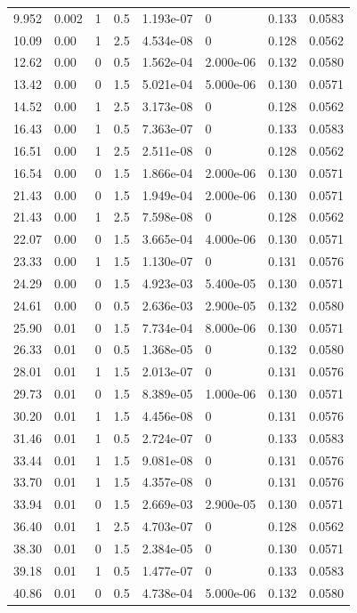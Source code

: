 \documentclass[preview]{standalone}
\begin{document}
{{\begin{tabular}{L{1.2cm}C{1.2cm} C{0.3cm}C{0.5cm} C{1.4cm}C{1.4cm} C{1.4cm}C{1.4cm}}
  9.952  &  0.002  & 1     & 0.5 &  1.193e-07  & 0  & 0.133 &  0.0583   \\ 
  10.09  &  0.00  & 1     & 2.5 &  4.534e-08  & 0  & 0.128 &  0.0562   \\ 
  12.62  &  0.00  & 0     & 0.5 &  1.562e-04  & 2.000e-06  & 0.132 &  0.0580   \\ 
  13.42  &  0.00  & 0     & 1.5 &  5.021e-04  & 5.000e-06  & 0.130 &  0.0571   \\ 
  14.52  &  0.00  & 1     & 2.5 &  3.173e-08  & 0  & 0.128 &  0.0562   \\ 
  16.43  &  0.00  & 1     & 0.5 &  7.363e-07  & 0  & 0.133 &  0.0583   \\ 
  16.51  &  0.00  & 1     & 2.5 &  2.511e-08  & 0  & 0.128 &  0.0562   \\ 
  16.54  &  0.00  & 0     & 1.5 &  1.866e-04  & 2.000e-06  & 0.130 &  0.0571   \\ 
  21.43  &  0.00  & 0     & 1.5 &  1.949e-04  & 2.000e-06  & 0.130 &  0.0571   \\ 
  21.43  &  0.00  & 1     & 2.5 &  7.598e-08  & 0  & 0.128 &  0.0562   \\ 
  22.07  &  0.00  & 0     & 1.5 &  3.665e-04  & 4.000e-06  & 0.130 &  0.0571   \\ 
  23.33  &  0.00  & 1     & 1.5 &  1.130e-07  & 0  & 0.131 &  0.0576   \\ 
  24.29  &  0.00  & 0     & 1.5 &  4.923e-03  & 5.400e-05  & 0.130 &  0.0571   \\ 
  24.61  &  0.00  & 0     & 0.5 &  2.636e-03  & 2.900e-05  & 0.132 &  0.0580   \\ 
  25.90  &  0.01  & 0     & 1.5 &  7.734e-04  & 8.000e-06  & 0.130 &  0.0571   \\ 
  26.33  &  0.01  & 0     & 0.5 &  1.368e-05  & 0  & 0.132 &  0.0580   \\ 
  28.01  &  0.01  & 1     & 1.5 &  2.013e-07  & 0  & 0.131 &  0.0576   \\ 
  29.73  &  0.01  & 0     & 1.5 &  8.389e-05  & 1.000e-06  & 0.130 &  0.0571   \\ 
  30.20  &  0.01  & 1     & 1.5 &  4.456e-08  & 0  & 0.131 &  0.0576   \\ 
  31.46  &  0.01  & 1     & 0.5 &  2.724e-07  & 0  & 0.133 &  0.0583   \\ 
  33.44  &  0.01  & 1     & 1.5 &  9.081e-08  & 0  & 0.131 &  0.0576   \\ 
  33.70  &  0.01  & 1     & 1.5 &  4.357e-08  & 0  & 0.131 &  0.0576   \\ 
  33.94  &  0.01  & 0     & 1.5 &  2.669e-03  & 2.900e-05  & 0.130 &  0.0571   \\ 
  36.40  &  0.01  & 1     & 2.5 &  4.703e-07  & 0  & 0.128 &  0.0562   \\ 
  38.30  &  0.01  & 0     & 1.5 &  2.384e-05  & 0  & 0.130 &  0.0571   \\ 
  39.18  &  0.01  & 1     & 0.5 &  1.477e-07  & 0  & 0.133 &  0.0583   \\ 
  40.86  &  0.01  & 0     & 0.5 &  4.738e-04  & 5.000e-06  & 0.132 &  0.0580   \\ 
\hline 
\end{tabular} 

}}
\end{document}
